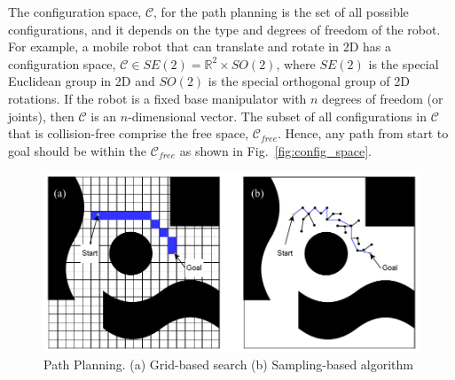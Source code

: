 The configuration space, $\mathcal{C}$, for the path planning is the set of all possible configurations, and it depends on the type and degrees of freedom of the robot. For example, a mobile robot that can translate and rotate in 2D has a configuration space, $\mathcal{C} \in SE(2) = \mathbb{R}^2 \times SO(2)$, where $SE(2)$ is the special Euclidean group in 2D and $SO(2)$ is the special orthogonal group of 2D rotations. If the robot is a fixed base manipulator with $n$ degrees of freedom (or joints), then $\mathcal{C}$ is an $n$-dimensional vector. The subset of all configurations in $\mathcal{C}$ that is collision-free comprise the free space, $\mathcal{C}_{free}$. Hence, any path from start to goal should be within the $\mathcal{C}_{free}$ as shown in Fig.~\ref{fig:config_space}. 

\begin{figure}[h!]
    \centering
    \includegraphics[width=0.9\columnwidth]{images/grid_vs_sampling.pdf}
    \caption{Path Planning. (a) Grid-based search (b) Sampling-based algorithm}
    \label{fig:grid_v_sample}
\end{figure}

